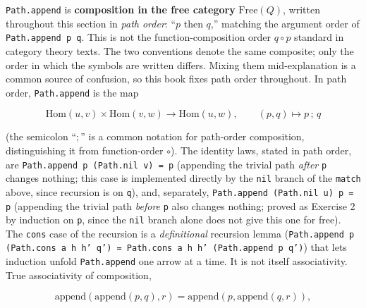 \begin{mathreading}

\texttt{Path.append} is \textbf{composition in the free category} \(\mathrm{Free}(Q)\), written throughout this section in \emph{path order}: ``\(p\) then \(q\),'' matching the argument order of \texttt{Path.append p q}. This is not the function-composition order \(q \circ p\) standard in category theory texts. The two conventions denote the same composite; only the order in which the symbols are written differs. Mixing them mid-explanation is a common source of confusion, so this book fixes path order throughout. In path order, \texttt{Path.append} is the map

\end{mathreading}

\[
\mathrm{Hom}(u,v) \times \mathrm{Hom}(v,w) \longrightarrow \mathrm{Hom}(u,w),
\qquad (p, q) \longmapsto p\,;\,q
\]

(the semicolon ``\(;\)'' is a common notation for path-order composition, distinguishing it from function-order \(\circ\)). The identity laws, stated in path order, are \texttt{Path.append p (Path.nil v) = p} (appending the trivial path \emph{after} \texttt{p} changes nothing; this case is implemented directly by the \texttt{nil} branch of the \texttt{match} above, since recursion is on \texttt{q}), and, separately, \texttt{Path.append (Path.nil u) p = p} (appending the trivial path \emph{before} \texttt{p} also changes nothing; proved as Exercise 2 by induction on \texttt{p}, since the \texttt{nil} branch alone does not give this one for free). The \texttt{cons} case of the recursion is a \emph{definitional} recursion lemma (\texttt{Path.append p (Path.cons a h h' q') = Path.cons a h h' (Path.append p q')}) that lets induction unfold \texttt{Path.append} one arrow at a time. It is not itself associativity. True associativity of composition,

\[
\mathrm{append}(\mathrm{append}(p, q), r) = \mathrm{append}(p, \mathrm{append}(q, r)),
\]

